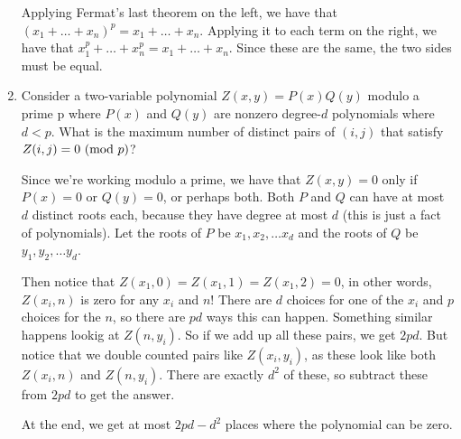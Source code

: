 \documentclass{article}
\begin{document}
\begin{enumerate}
        \begin{solution}
            Applying Fermat's last theorem on the left, we have that $(x_1 + \ldots + x_n)^p = x_1 + \ldots + x_n$. Applying it to each term on the right, we have that
            $x_1^p + \ldots + x_n^p = x_1 + \ldots + x_n$. Since these are the same, the two sides must be equal.
        \end{solution}
        \item Consider a two-variable polynomial $Z(x,y)=P(x)Q(y)$ modulo a prime p where $P(x)$ and $Q(y)$ are nonzero degree-$d$ polynomials where $d < p$. What is the maximum number of distinct pairs of $(i, j)$ that satisfy $Z(i, j) = 0 \textnormal{ (mod } p)$?
        \begin{solution}
            Since we're working modulo a prime, we have that $Z(x, y) = 0$ only if $P(x) = 0$ or $Q(y) = 0$, or perhaps both. Both $P$ and $Q$ can have at most $d$ distinct roots each, because they have degree at most $d$ (this is just a fact of polynomials). Let the roots of
            $P$ be $x_1, x_2, \ldots x_d$ and the roots of $Q$ be $y_1, y_2, \ldots y_d$.
            
            Then notice that $Z(x_1, 0) = Z(x_1, 1) = Z(x_1, 2) = 0$, in other words, $Z(x_i, n)$ is zero for any $x_i$ and $n$! There are
            $d$ choices for one of the $x_i$ and $p$ choices for the $n$, so there are $pd$ ways this can happen. Something similar happens lookig at $Z(n, y_i)$. So if we add up all these pairs, we get $2pd$.
            But notice that we double counted pairs like $Z(x_i, y_i)$, as these look like both $Z(x_i, n)$ and $Z(n, y_i)$. There are exactly $d^2$ of these, so subtract these from $2pd$ to get the answer.
            
            At the end, we get at most $2pd - d^2$ places where the polynomial can be zero.
        \end{solution}
    \end{enumerate}
\end{document}
